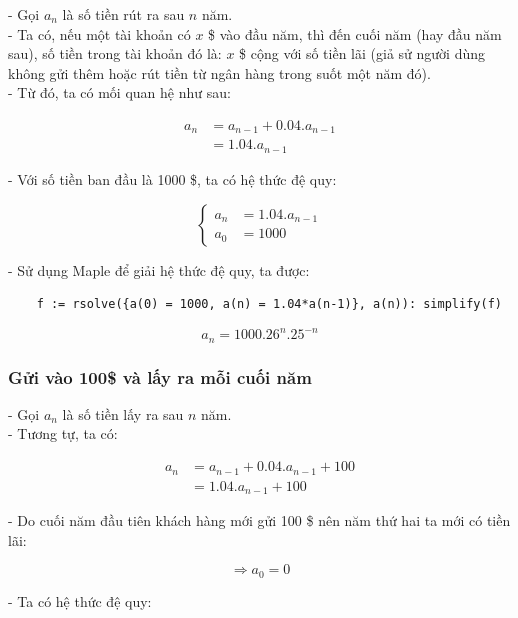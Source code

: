 \documentclass[12pt]{article}
\begin{document}
\begin{sloppypar}
- Gọi \(a_{n}\) là số tiền rút ra sau \(n\) năm. \\
- Ta có, nếu một tài khoản có \(x\) \$ vào đầu năm, thì đến cuối năm (hay đầu năm sau), số tiền trong tài khoản đó là: \(x\) \$ cộng với số tiền lãi (giả sử người dùng không gửi thêm hoặc rút tiền từ ngân hàng trong suốt một năm đó). \\
- Từ đó, ta có mối quan hệ như sau:

\begin{align*}
    a_{n}   & = a_{n-1} + 0.04.a_{n-1} \\
            & = 1.04.a_{n-1}
\end{align*}


- Với số tiền ban đầu là 1000 \$, ta có hệ thức đệ quy:

\[
    \begin{cases}
        a_{n} & = 1.04.a_{n-1} \\             
        a_{0} & = 1000
    \end{cases}
    \]

- Sử dụng Maple để giải hệ thức đệ quy, ta được:

\begin{verbatim}
    f := rsolve({a(0) = 1000, a(n) = 1.04*a(n-1)}, a(n)): simplify(f)
\end{verbatim}

\begin{equation*}
    a_{n} = 1000.26^{n}.25^{-n}
\end{equation*}

\subsubsection{Gửi vào 100\$ và lấy ra mỗi cuối năm}

- Gọi \(a_{n}\) là số tiền lấy ra sau \(n\) năm. \\
- Tương tự, ta có:

\begin{align*}
    a_{n}   & = a_{n-1} + 0.04.a_{n-1} + 100 \\
            & = 1.04.a_{n-1} + 100
\end{align*}

- Do cuối năm đầu tiên khách hàng mới gửi 100 \$ nên năm thứ hai ta mới có tiền lãi:

\begin{equation*}
    \Rightarrow a_{0} = 0
\end{equation*}

- Ta có hệ thức đệ quy:


\end{sloppypar}
\end{document}
